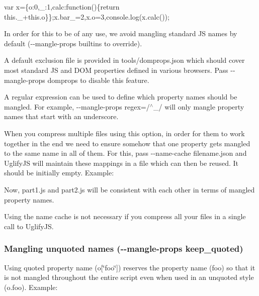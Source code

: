 \begin{DoxyCode}
var x=\{o:0,\_:1,calc:function()\{return this.\_+this.o\}\};x.bar\_=2,x.o=3,console.log(x.calc());
\end{DoxyCode}


In order for this to be of any use, we avoid mangling standard JS names by default ({\ttfamily -\/-\/mangle-\/props builtins} to override).

A default exclusion file is provided in {\ttfamily tools/domprops.\+json} which should cover most standard JS and D\+OM properties defined in various browsers. Pass {\ttfamily -\/-\/mangle-\/props domprops} to disable this feature.

A regular expression can be used to define which property names should be mangled. For example, {\ttfamily -\/-\/mangle-\/props regex=/$^\wedge$\+\_\+/} will only mangle property names that start with an underscore.

When you compress multiple files using this option, in order for them to work together in the end we need to ensure somehow that one property gets mangled to the same name in all of them. For this, pass {\ttfamily -\/-\/name-\/cache filename.\+json} and Uglify\+JS will maintain these mappings in a file which can then be reused. It should be initially empty. Example\+:




Now, {\ttfamily part1.\+js} and {\ttfamily part2.\+js} will be consistent with each other in terms of mangled property names.

Using the name cache is not necessary if you compress all your files in a single call to Uglify\+JS.

\subsubsection*{Mangling unquoted names ({\ttfamily -\/-\/mangle-\/props keep\+\_\+quoted})}

Using quoted property name ({\ttfamily o\mbox{[}\char`\"{}foo\char`\"{}\mbox{]}}) reserves the property name ({\ttfamily foo}) so that it is not mangled throughout the entire script even when used in an unquoted style ({\ttfamily o.\+foo}). Example\+:


